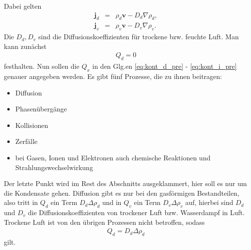 \documentclass{book}
\begin{document}
%
Dabei gelten
%
\begin{eqnarray}
\mathbf{j}_d & = & \rho_d\mathbf{v} - D_d\nabla\rho_d,\\
\mathbf{j}_v & = & \rho_v\mathbf{v} - D_v\nabla\rho_v.
\end{eqnarray}
%
Die $D_d, D_v$ sind die Diffusionskoeffizienten für trockene bzw. feuchte Luft. Man kann zunächst
%
\begin{eqnarray}
Q_d = 0
\end{eqnarray}
%
festhalten. Nun sollen die $Q_x$ in den Glg.en \eqref{eq:kont_d_pre} - \eqref{eq:kont_i_pre} genauer angegeben werden. Es gibt fünf Prozesse, die zu ihnen beitragen:
%
\begin{itemize}
\item Diffusion
\item Phasenübergänge
\item Kollisionen
\item Zerfälle
\item bei Gasen, Ionen und Elektronen auch chemische Reaktionen und Strahlungswechselwirkung
\end{itemize}
%
Der letzte Punkt wird im Rest des Abschnitts ausgeklammert, hier soll es nur um die Kondensate gehen. Diffusion gibt es nur bei den gasförmigen Bestandteilen, also tritt in $Q_d$ ein Term $D_d\Delta\rho_d$ und in $Q_v$ ein Term $D_v\Delta\rho_v$ auf, hierbei sind $D_d$ und $D_v$ die Diffusionskoeffizienten von trockener Luft bzw. Wasserdampf in Luft. Trockene Luft ist von den übrigen Prozessen nicht betroffen, sodass
%
\begin{eqnarray}
Q_d = D_d\Delta\rho_d
\end{eqnarray}
%
gilt.
\end{document}
